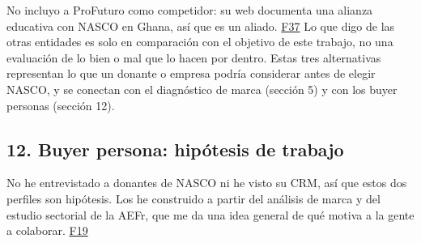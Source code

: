 \documentclass[
]{article}
\begin{document}
No incluyo a ProFuturo como competidor: su web documenta una alianza
educativa con NASCO en Ghana, así que es un aliado.
\href{https://profuturo.education/noticias/profuturo-nasco-feeding-minds-educacion-digital-ghana/}{F37}
Lo que digo de las otras entidades es solo en comparación con el
objetivo de este trabajo, no una evaluación de lo bien o mal que lo
hacen por dentro. Estas tres alternativas representan lo que un donante
o empresa podría considerar antes de elegir NASCO, y se conectan con el
diagnóstico de marca (sección 5) y con los buyer personas (sección 12).

\hypertarget{buyer-persona-hipuxf3tesis-de-trabajo}{%
\subsection{12. Buyer persona: hipótesis de
trabajo}\label{buyer-persona-hipuxf3tesis-de-trabajo}}

No he entrevistado a donantes de NASCO ni he visto su CRM, así que estos
dos perfiles son hipótesis. Los he construido a partir del análisis de
marca y del estudio sectorial de la AEFr, que me da una idea general de
qué motiva a la gente a colaborar.
\href{https://www.aefundraising.org/perfil-donante-2024-que-impulsa-a-los-espanoles-a-colaborar/}{F19}
\end{document}
